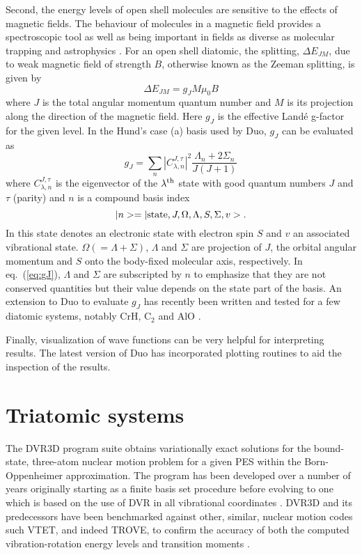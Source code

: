 \documentclass[12pt]{article}
\newcommand{\2}{$_{2}$}
\newcommand{\3}{$_{3}$}
\newcommand{\4}{$_{4}$}
\begin{document}
Second, the energy levels of open shell molecules are sensitive to the
effects of magnetic fields. The behaviour of molecules in a magnetic
field provides a spectroscopic tool as well as being important in fields
as diverse as molecular trapping \cite{14BaMcNo.diatom} and astrophysics \cite{02BeSoxx.diatom}.
For an open shell diatomic, the splitting, $\Delta E_{JM}$, due to weak magnetic field of strength
$B$, otherwise known
as the Zeeman splitting, is given by
\begin{equation}
 \Delta E_{JM} = g_J M \mu_0 B
\end{equation}
where $J$ is the total angular momentum quantum number and $M$ is its projection along the direction
of the magnetic field. Here $g_J$ is the effective Land\'e g-factor for the given level.
In the Hund's case (a) basis used by {\sc Duo}, $g_J$ can be evaluated as
\begin{equation}
 g_J = \sum_n |C^{J,\tau}_{\lambda,n}|^2  \frac{\Lambda_n + 2\Sigma_n}{J(J+1)} \label{eq:gJ}
\end{equation}
where $C^{J,\tau}_{\lambda,n}$ is the eigenvector of the $\lambda^{\rm th}$ state with
good quantum numbers $J$ and $\tau$ (parity) and $n$ is a compound basis index
\begin{equation}
 |n> = |{\rm state},J,\Omega,\Lambda,S,\Sigma,v>.
\end{equation}
In this state denotes an electronic state with electron spin $S$ and
$v$ an associated vibrational state. $\Omega (=\Lambda +\Sigma)$,
$\Lambda$ and $\Sigma$ are projection of $J$, the orbital angular
momentum and $S$ onto the body-fixed molecular axis, respectively. In
eq.~(\ref{eq:gJ}), $\Lambda$ and $\Sigma$ are subscripted by $n$ to
emphasize that they are not conserved quantities but their value
depends on the state part of the basis. An extension to {\sc Duo} to
evaluate $g_J$ has recently been written and tested for a few diatomic
systems, notably CrH, C$_2$ and AlO \cite{jtgfac}.

Finally, visualization of wave functions can be very helpful for interpreting results. The latest
version of {\sc Duo} has incorporated plotting routines to aid the inspection of the results.



\section{Triatomic systems}

The {\sc DVR3D} program suite obtains variationally exact solutions
for the bound-state, three-atom nuclear motion problem for a given PES
within the Born-Oppenheimer approximation. The program has been developed
over a number of years originally starting as a finite basis set
procedure \cite{jt20,jt48,jt79,jt128} before evolving \cite{jt129} to
one which is based on the use of DVR in all vibrational coordinates
\cite{jt130,jt160}.  DVR3D and its predecessors have been benchmarked
against other, similar, nuclear motion codes such {\sc VTET},
and indeed {\sc TROVE},
to confirm the accuracy
of both the computed vibration-rotation energy levels
\cite{jt309,jt635} and transition moments \cite{jt78}.
\end{document}
